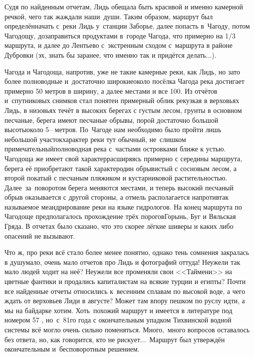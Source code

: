 Судя по найденным отчетам, Лидь обещала быть красивой и именно камерной речкой, чего так жаждали наши~души. Таким образом, маршрут был определён\mdash начать с~реки Лидь у~станции Заборье, далее попасть в~Чагоду, потом Чагодощу, дозаправиться продуктами в~городе Чагода, что примерно на 1/3 маршрута, и далее до Лентьево с~экстренным сходом с~маршрута в районе Дубровки (эх, знать бы заранее, что именно так и придётся делать$\ldots$).
 
Чагода и Чагодоща, напротив, уже не такие камерные реки, как Лидь, но зато более полноводные и~достаточно широкие\mdash около посёлка Чагода река достигает примерно 50 метров в ширину, а далее местами и все 100. Из отчётов и~спутниковых снимков стал понятен примерный облик рек\mdash узкая в верховьях Лидь, в низовьях течёт в высоких берегах с густым лесом, грунты в основном песчаные, берега имеют песчаные обрывы, порой достаточно большой высоты\mdash около 5\thinspace-- метров. По~Чагоде нам необходимо было пройти лишь небольшой участок\mdash характер реки тут обычный, не~слишком примечательный\mdash полноводная река с~частыми островками ближе к устью. Чагодоща же имеет свой характер\mdash расширяясь примерно с середины маршрута, берега её приобретают такой характер\mdash один обрывистый с сосновым лесом, а второй покатый с песчаным пляжиком и кустарниковой растительностью. Далее~за~поворотом берега меняются местами, и теперь высокий песчаный обрыв оказывается с другой стороны, а отмель располагается напротив\mdash так называемое меандрирование реки на языке гидрологов. На конец маршрута по Чагодоще предполагалось прохождение трёх порогов\mdash Горынь, Буг и Вяльская Гряда. В отчетах было сказано, что это скорее лёгкие шиверы и каких либо опасений не вызывают. 

Что ж, про реки всё стало более менее понятно, однако тень сомнения закралась в душу\mdash мало, очень мало отчетов про Лидь и фотографий оттуда! Неужели так мало людей ходит на неё? Неужели все променяли свои <<Таймени>> на цветные фантики и продались капиталистам на всякие турции и египты? Почти все найденные отчеты относились к~весенним сплавам по высокой воде, а чего ждать от верховьев Лиди в августе? Может там впору пешком по руслу идти, а мы на байдарке хотим. Хоть~похожий маршрут и имеется в литературе под номером 57 \cite{Рыжавский}, но~с~81\sdash го года с окончательным упадком Тихвинской водной системы всё могло очень сильно поменяться. Много,~много вопросов оставалось без ответа, но, как говорится, кто не рискует$\ldots$~Маршрут был утверждён окончательным и~бесповоротным решением.


